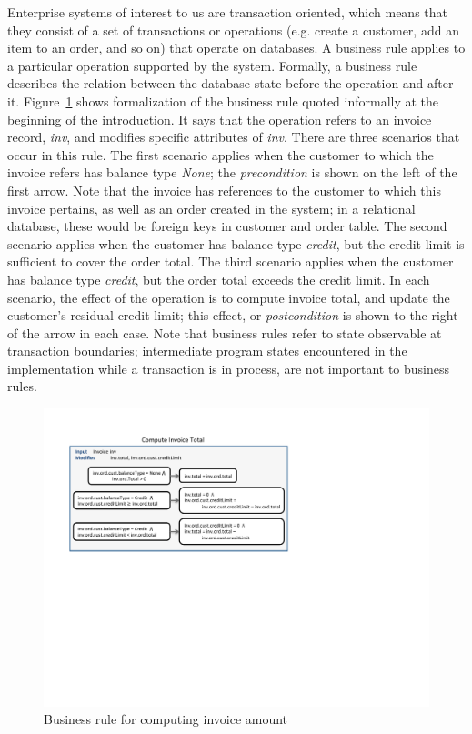 Enterprise systems of interest to us are transaction oriented, which means that they consist of a set of
transactions or operations (e.g. create a customer, add an item to an order, and so on) that operate on databases.  
A business rule applies to a particular operation supported by the system.  Formally, a business rule
describes the relation between the database state before the operation and after it.  Figure~\ref{fig:invoice} shows
formalization of the business rule quoted informally at the beginning of the introduction.  It says that
the operation refers to an invoice record, \textit{inv}, and modifies specific attributes of \textit{inv}.
There are three scenarios that occur in this rule.  The first scenario applies when the customer to which the
invoice refers has balance type \textit{None}; the \textit{precondition} is shown on the left of the first arrow.  
Note that the invoice has references to the customer to which this invoice pertains, 
as well as an order created in the system; in a relational database, these would be foreign keys in customer and 
order table.  The second scenario applies when the customer has balance type \textit{credit}, but the credit limit 
is sufficient to cover the order total.    The third scenario applies when the customer has balance type 
\textit{credit}, but the order total exceeds the credit limit.  In each scenario, the effect of the operation is to 
compute invoice total, and update the customer's residual credit limit; this effect, or \textit{postcondition} is 
shown to the right of the arrow in each case.  Note that business rules refer to state observable at transaction 
boundaries; intermediate program states encountered in the implementation while a transaction is in process, are 
not important to business rules.

\begin{figure}
\centering
\includegraphics[trim=30 300 270 0,clip,width=\columnwidth]{figs/invoice}
\caption{Business rule for computing invoice amount}
\label{fig:invoice}
\end{figure}

